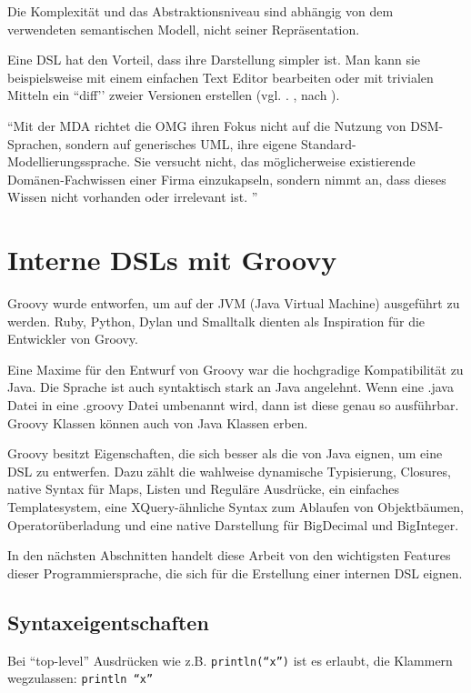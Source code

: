 \documentclass[11pt,english,ngerman, headsepline]{scrreprt}
\begin{document}
Die Komplexität und das Abstraktionsniveau sind abhängig von dem verwendeten
semantischen Modell, nicht seiner Repräsentation. 

Eine DSL hat den Vorteil, dass ihre Darstellung simpler ist. Man kann sie
beispielsweise mit einem einfachen Text Editor bearbeiten oder mit trivialen
Mitteln ein ``diff’’ zweier Versionen erstellen (vgl.  \cite{cuadrado2007building}.
\cite{spinellis2008rational}, nach \cite{biekermetaprogrammierung}).

``Mit der MDA richtet die OMG ihren Fokus nicht auf die Nutzung
von DSM-Sprachen, sondern auf generisches UML, ihre
eigene Standard-Modellierungssprache. Sie versucht nicht, das
möglicherweise existierende Domänen-Fachwissen einer Firma
einzukapseln, sondern nimmt an, dass dieses Wissen nicht
vorhanden oder irrelevant ist. '' \cite{dsmUhrenArtikel}
 

\section{Interne DSLs mit Groovy}

Groovy wurde entworfen, um auf der JVM (Java Virtual Machine)
ausgeführt zu werden. Ruby, Python, Dylan und Smalltalk dienten als Inspiration
für die Entwickler von Groovy.

Eine Maxime für den Entwurf von Groovy war die hochgradige Kompatibilität zu
Java. Die Sprache ist auch syntaktisch stark an Java angelehnt. Wenn eine .java
Datei in eine .groovy Datei umbenannt wird, dann ist diese genau so ausführbar.
Groovy Klassen können auch von Java Klassen erben.

Groovy besitzt Eigenschaften, die sich besser als die von Java eignen, um eine
DSL zu entwerfen. Dazu zählt die wahlweise dynamische Typisierung, Closures,
native Syntax für Maps, Listen und Reguläre Ausdrücke, ein einfaches
Templatesystem, eine
XQuery-ähnliche Syntax zum Ablaufen von Objektbäumen, Operatorüberladung und
eine native Darstellung für BigDecimal und BigInteger.  

In den nächsten Abschnitten handelt diese Arbeit von den wichtigsten Features
dieser Programmiersprache, die sich für die Erstellung einer internen DSL
eignen. 


\subsection{Syntaxeigentschaften}

Bei ``top-level'' Ausdrücken wie z.B. \texttt{println(``x'')} ist es erlaubt,
die Klammern wegzulassen: \texttt{println ``x'' }
 
\end{document}
